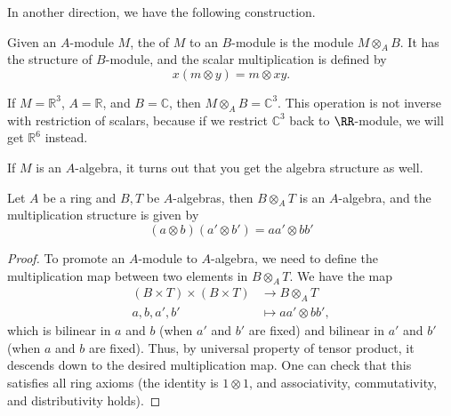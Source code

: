 In another direction, we have the following construction.
\begin{definition}
Given an $A$-module $M$,
the  of $M$ to an $B$-module 
is the module $M\otimes_A B$.
It has the structure of $B$-module,
and the scalar multiplication is defined by
$$x(m\otimes y) = m\otimes xy.$$
\end{definition}
\begin{example}
If $M=\mathbb R^3$, $A=\mathbb R$, and $B=\mathbb C$,
then $M\otimes_A B = \mathbb C^3$.
This operation is not inverse with restriction of scalars,
because if we restrict $\mathbb C^3$ back to $\RR$-module, we will get $\mathbb R^6$ instead.
\end{example}

If $M$ is an $A$-algebra, it turns out that you
get the algebra structure as well.
\begin{proposition}
    Let $A$ be a ring and $B,T$ be $A$-algebras,
    then $B\otimes_A T$ is an $A$-algebra,
    and the multiplication structure is given by 
    $$(a\otimes b)(a'\otimes b') = aa'\otimes bb'$$
\end{proposition}
\begin{proof}
    To promote an $A$-module to $A$-algebra,
    we need to define the multiplication map 
    between two elements in $B\otimes_A T$.
    We have the map
    \begin{align*}
	(B\times T) \times (B\times T) &\to B\otimes_A T \\
	a, b, a', b' &\mapsto aa'\otimes bb',
    \end{align*}
    which is bilinear in $a$ and $b$ (when $a'$ and $b'$ are fixed) 
    and bilinear in $a'$ and $b'$ (when $a$ and $b$ are fixed).
    Thus, by universal property of tensor product,
    it descends down to the desired multiplication map.
    One can check that this satisfies all ring axioms
    (the identity is $1\otimes 1$, and associativity,
    commutativity, and distributivity holds).
\end{proof}

